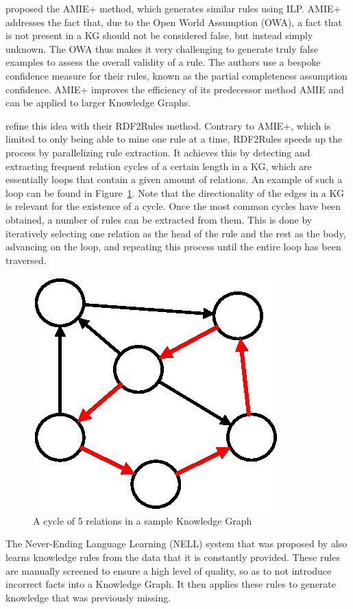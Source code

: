 \citet{galarraga2015} proposed the AMIE+ method, which generates similar rules using ILP. AMIE+ addresses the fact that, due to the Open World Assumption (OWA), a fact that is not present in a KG should not be considered false, but instead simply unknown. The OWA thus makes it very challenging to generate truly false examples to assess the overall validity of a rule. The authors use a bespoke confidence measure for their rules, known as the partial completeness assumption confidence. AMIE+ improves the efficiency of its predecessor method AMIE \cite{galarraga2013} and can be applied to larger Knowledge Graphs.

\citet{wang2015} refine this idea with their RDF2Rules method. Contrary to AMIE+, which is limited to only being able to mine one rule at a time, RDF2Rules speeds up the process by parallelizing rule extraction. It achieves this by detecting and extracting frequent relation cycles of a certain length in a KG, which are essentially loops that contain a given amount of relations. An example of such a loop can be found in Figure~\ref{fig:rule-cycle}. Note that the directionality of the edges in a KG is relevant for the existence of a cycle. Once the most common cycles have been obtained, a number of rules can be extracted from them. This is done by iteratively selecting one relation as the head of the rule and the rest as the body, advancing on the loop, and repeating this process until the entire loop has been traversed.

\begin{figure}[!htp]
    \centering
    \includegraphics[width=.35\textwidth]{fig/rules/cycle}
    \caption{A cycle of 5 relations in a sample Knowledge Graph}
    \label{fig:rule-cycle}
\end{figure}

The Never-Ending Language Learning (NELL) system that was proposed by \citet{mitchell2018} also learns knowledge rules from the data that it is constantly provided. These rules are manually screened to ensure a high level of quality, so as to not introduce incorrect facts into a Knowledge Graph. It then applies these rules to generate knowledge that was previously missing.

